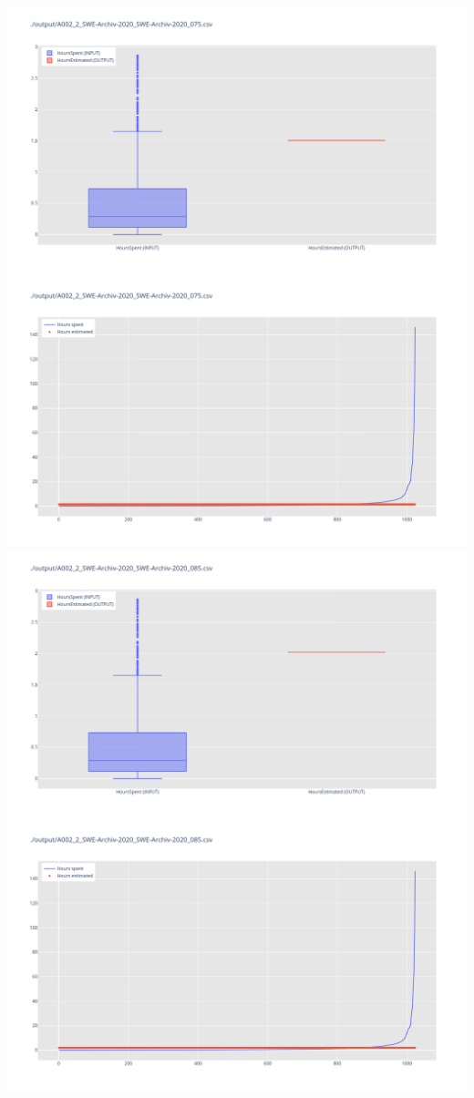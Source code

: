 \includegraphics[width=\textwidth]{Scripts/output/A002_2_SWE-Archiv-2020_SWE-Archiv-2020_075.csv.png}
\includegraphics[width=\textwidth]{Scripts/output/A002_2_SWE-Archiv-2020_SWE-Archiv-2020_075.csv.scatter.png}
\includegraphics[width=\textwidth]{Scripts/output/A002_2_SWE-Archiv-2020_SWE-Archiv-2020_085.csv.png}
\includegraphics[width=\textwidth]{Scripts/output/A002_2_SWE-Archiv-2020_SWE-Archiv-2020_085.csv.scatter.png}
